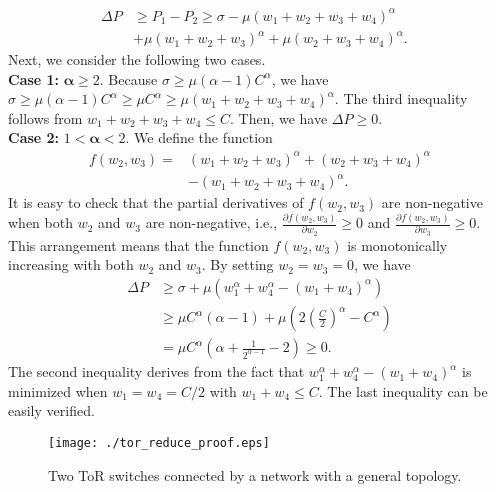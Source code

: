 \documentclass[journal,single-space,two column,twoside,10pt]{IEEEtran}
\begin{document}
\begin{equation}
\begin{aligned}
\Delta P &\geq P_1 - P_2 \geq \sigma - \mu (w_1 + w_2 + w_3 + w_4)^{\alpha} \\
		&+ \mu (w_1 + w_2 + w_3)^{\alpha} + \mu(w_2 + w_3 + w_4)^{\alpha}.&
\end{aligned}
\end{equation}
Next, we consider the following two cases. \\
\textbf{Case 1:} $\mathbf{\alpha} \geq 2$. Because $\sigma \geq \mu (\alpha - 1) C^{\alpha}$, we have
$\sigma  \geq \mu (\alpha - 1)  C^{\alpha} \geq \mu C^{\alpha} \geq \mu (w_1 + w_2 + w_3 + w_4)^{\alpha}$.
The third inequality follows from $w_1 + w_2 + w_3 + w_4 \leq C$. Then, we have $\Delta P \geq 0$. \\
\textbf{Case 2:} $1 < \mathbf{\alpha} < 2$. We define the function
\begin{equation}
\begin{aligned}
f(w_2, w_3) =&(w_1 + w_2 + w_3)^{\alpha} + (w_2 + w_3 + w_4)^{\alpha}\\
&- (w_1 + w_2 + w_3 + w_4)^{\alpha}.
\end{aligned}
\end{equation}
It is easy to check that the partial derivatives of $f(w_2,w_3)$ are non-negative when both $w_2$ and $w_3$ are non-negative, i.e.,
$\frac{\partial{f(w_2,w_3)}}{\partial w_2} \geq 0$ and $\frac{\partial{f(w_2,w_3)}}{\partial w_3} \geq 0$.
This arrangement means that the function $f(w_2,w_3)$ is monotonically increasing with both $w_2$ and $w_3$. By setting $w_2=w_3=0$, we have
\begin{equation}
\begin{aligned}
	\Delta P	& \geq \sigma + \mu \left(w_1^{\alpha} + w_4^{\alpha} - (w_1 + w_4)^{\alpha}\right) \\
			 & \geq\mu C^{\alpha}\left(\alpha - 1\right) + \mu \left(2\left(\frac{C}{2}\right)^\alpha - C^{\alpha}\right) \\
			  &= \mu C^{\alpha} \left(\alpha + \frac{1}{2^{\alpha - 1}} - 2\right) \geq 0.
\end{aligned}
\end{equation}
The second inequality derives from the fact that $w_1^{\alpha} + w_4^{\alpha} - (w_1 + w_4)^{\alpha}$ is minimized when $w_1 = w_4 = C/2$ with $w_1 + w_4 \leq C$. The last inequality can be easily verified.

\begin{figure}[!t]
\centering
\texttt{[image: ./tor\_reduce\_proof.eps]}
\caption{\label{fig:tor_reduce_proof} Two ToR switches connected by a network with a general topology.}
\end{figure}
\end{document}
